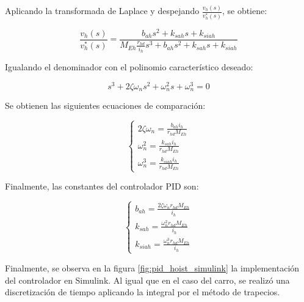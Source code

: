\documentclass{article}
\begin{document}
            Aplicando la transformada de Laplace y despejando \(\frac{v_h(s)}{v_h^*(s)}\), se obtiene:
            
            \begin{equation}
                \frac{v_h(s)}{v_h^*(s)} = \frac{b_{ah} s^2 + k_{sah} s + k_{siah}}{M_{Eh} \frac{r_{hd}}{i_h} s^3 + b_{ah} s^2 + k_{sah} s + k_{siah}}
            \end{equation}
            
            Igualando el denominador con el polinomio característico deseado:
            
            \begin{equation}
                s^3 + 2 \zeta \omega_n s^2 + \omega_n^2 s + \omega_n^3 = 0
            \end{equation}
            
            Se obtienen las siguientes ecuaciones de comparación:
            
            \begin{equation}
                \begin{cases}
                    2 \zeta \omega_n = \frac{b_{ah} i_h}{r_{hd} M_{Eh}} \\
                    \omega_n^2 = \frac{k_{sah} i_h}{r_{hd} M_{Eh}} \\
                    \omega_n^3 = \frac{k_{siah} i_h}{r_{hd} M_{Eh}}
                \end{cases}
            \end{equation}
            
            Finalmente, las constantes del controlador PID son:
            
            \begin{equation}
                \begin{cases}
                    b_{ah} = \frac{2 \zeta \omega_n r_{hd} M_{Eh}}{i_h} \\
                    k_{sah} = \frac{\omega_n^2 r_{hd} M_{Eh}}{i_h} \\
                    k_{siah} = \frac{\omega_n^3 r_{hd} M_{Eh}}{i_h}
                \end{cases}
            \end{equation}

            Finalmente, se observa en la figura \ref{fig:pid_hoist_simulink} la implementación del controlador en Simulink. Al igual que en el caso del carro, se realizó una discretización de tiempo aplicando la integral por el método de trapecios.
\end{document}
